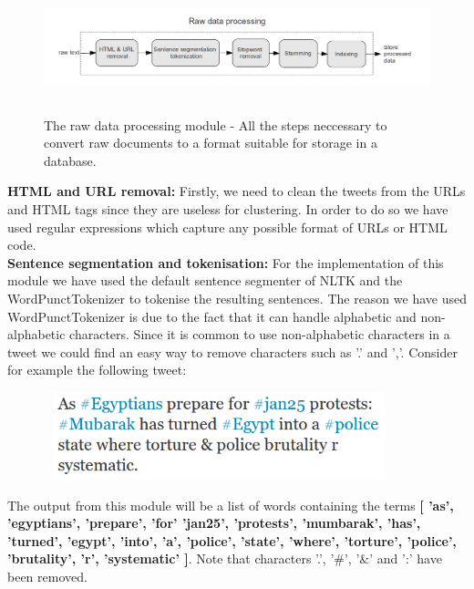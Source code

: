 \begin{figure}[htbp]
  \begin{center}
    \includegraphics[height=1.5in, width=6in]{raw-data-processing}
    \caption{The raw data processing module - All the steps neccessary to convert raw documents to a format suitable for storage in a database.}
    \label{RawTextProcessingOverview}
  \end{center}
\end{figure} 

\textbf{HTML and URL removal:} Firstly, we need to clean the tweets from the URLs and HTML tags since they are useless for clustering. In order to do so we have used regular expressions which capture any possible format of URLs or HTML code.\\

\textbf{Sentence segmentation and tokenisation:} For the implementation of this module we have used the default sentence segmenter of NLTK and the WordPunctTokenizer to tokenise the resulting sentences. The reason we have used WordPunctTokenizer is due to the fact that it can handle alphabetic and non-alphabetic characters. Since it is common to use non-alphabetic characters in a tweet we could find an easy way to remove characters such as '.' and ','. Consider for example the following tweet:
 
\begin{figure}[htbp]
  \begin{center}
    \includegraphics[height=1in, width=4in]{tweet-text}
    \label{TweetText}
  \end{center}
\end{figure}

The output from this module will be a list of words containing the terms \textbf{[ 'as', 'egyptians', 'prepare', 'for' 'jan25', 'protests', 'mumbarak', 'has', 'turned', 'egypt', 'into', 'a', 'police', 'state', 'where', 'torture', 'police', 'brutality', 'r', 'systematic' ]}. Note that characters '.', '\#', '\&' and ':' have been removed. \\

